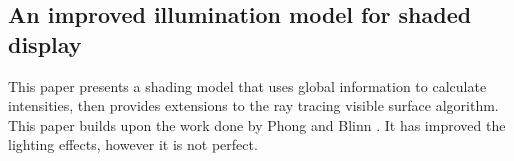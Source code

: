 \documentclass{scrartcl}
\begin{document}
\subsection{An improved illumination model for shaded display \cite{whitted2005improved}}

This paper presents a shading model that uses global information to calculate intensities, then provides extensions to the ray tracing visible surface algorithm. 
This paper builds upon the work done by Phong \cite{phong1975illumination} and Blinn \cite{Blinn1977}. It has improved the lighting effects, however it is not perfect.






\end{document}
